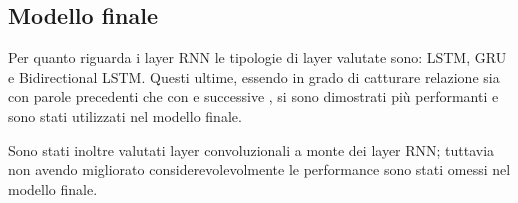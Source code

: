 



\subsection{Modello finale}

Per quanto riguarda i layer RNN le tipologie di layer valutate sono: LSTM, GRU e
Bidirectional LSTM. Questi ultime, essendo in grado di catturare relazione sia
con parole precedenti che con e successive \cite{schuster1997bidirectional}, si sono dimostrati più performanti e
sono stati utilizzati nel modello finale.

Sono stati inoltre valutati layer convoluzionali a monte dei layer RNN; tuttavia
non avendo migliorato considerevolevolmente le performance sono stati omessi nel
modello finale.

